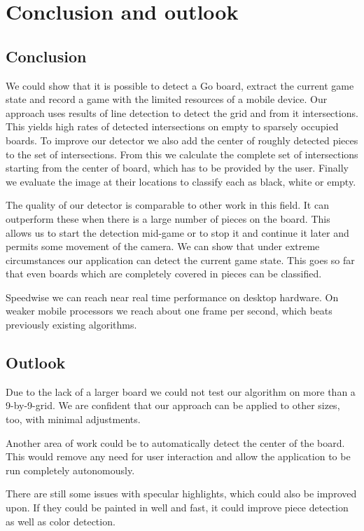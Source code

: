 
\chapter{Conclusion and outlook}
\section{Conclusion}
We could show that it is possible to detect a Go board, extract the current game state and record a game with the limited resources of a mobile device. Our approach uses results of line detection to detect the grid and from it intersections. This yields high rates of detected intersections on empty to sparsely occupied boards. To improve our detector we also add the center of roughly detected pieces to the set of intersections. From this we calculate the complete set of intersections starting from the center of board, which has to be provided by the user. Finally we evaluate the image at their locations to classify each as black, white or empty.

The quality of our detector is comparable to other work in this field. It can outperform these when there is a large number of pieces on the board. This allows us to start the detection mid-game or to stop it and continue it later and permits some movement of the camera. We can show that under extreme circumstances our application can detect the current game state. This goes so far that even boards which are completely covered in pieces can be classified.

Speedwise we can reach near real time performance on desktop hardware. On weaker mobile processors we reach about one frame per second, which beats previously existing algorithms.

\section{Outlook}
Due to the lack of a larger board we could not test our algorithm on more than a 9-by-9-grid. We are confident that our approach can be applied to other sizes, too, with minimal adjustments.

Another area of work could be to automatically detect the center of the board. This would remove any need for user interaction and allow the application to be run completely autonomously.

There are still some issues with specular highlights, which could also be improved upon. If they could be painted in well and fast, it could improve piece detection as well as color detection.
